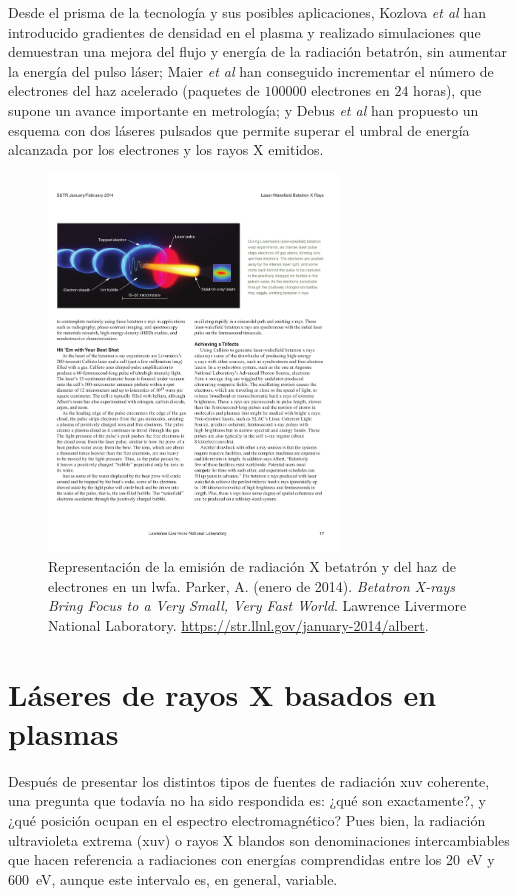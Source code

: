 Desde el prisma de la tecnología y sus posibles aplicaciones, Kozlova \emph{et al} \autocite{Kozlova2020} han introducido gradientes de densidad en el plasma y realizado simulaciones que demuestran una mejora del flujo y energía de la radiación betatrón, sin aumentar la energía del pulso láser; Maier \emph{et al} \autocite{Maier2020} han conseguido incrementar el número de electrones del haz acelerado (paquetes de $100000$ electrones en $24$ horas), que supone un avance importante en metrología; y Debus \emph{et al} \autocite{Debus2019} han propuesto un esquema con dos láseres pulsados que permite superar el umbral de energía alcanzada por los electrones y los rayos X emitidos. 

\begin{figure}[htbp]
  \centering
  \includegraphics[width=0.69\textwidth]{Figuras/ch1_betaxrays.pdf}
  \caption{Representación de la emisión de radiación X betatrón y del haz de electrones en un \acrshort{lwfa}. Parker, A. (enero de 2014). \emph{Betatron X-rays Bring Focus to a Very Small, Very Fast World}. Lawrence Livermore National Laboratory. \url{https://str.llnl.gov/january-2014/albert}.}
  \label{fig:1.22}
\end{figure}

\section{Láseres de rayos X basados en plasmas}\label{sec:1.4}
Después de presentar los distintos tipos de fuentes de radiación \acrshort{xuv} coherente, una pregunta que todavía no ha sido respondida es: ¿qué son exactamente?, y ¿qué posición ocupan en el espectro electromagnético? Pues bien, la radiación ultravioleta extrema (\acrshort{xuv}) o rayos X blandos son denominaciones intercambiables que hacen referencia a radiaciones con energías comprendidas entre los \qty{20}{eV} y \qty{600}{eV}, aunque este intervalo es, en general, variable. 

